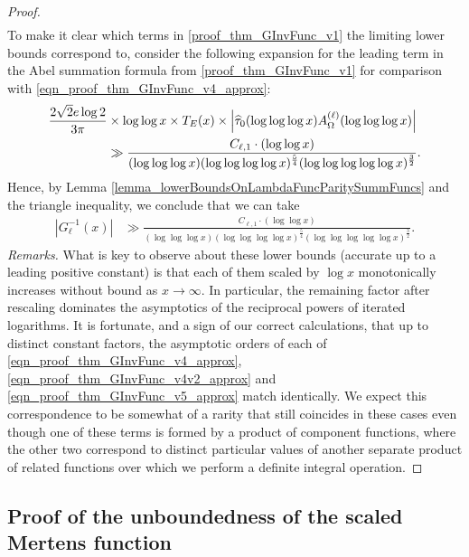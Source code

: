 \documentclass[11pt,reqno,a4letter]{article}
\numberwithin{figure}{section}
\numberwithin{table}{section}
\theoremstyle{plain}
\numberwithin{theorem}{section}
\theoremstyle{definition}
\newcommand{\SuccSim}[0]{\overset{_{\scriptsize{\blacktriangle}}}{\succsim}}
\renewcommand{\SuccSim}[0]{\ensuremath{\gg}}
\begin{document}
\begin{proof}
\begin{align}
\end{align} 
To make it clear which terms in \eqref{proof_thm_GInvFunc_v1} 
the limiting lower bounds correspond to, consider the following expansion for the leading term in 
the Abel summation formula from \eqref{proof_thm_GInvFunc_v1} for comparison with 
\eqref{eqn_proof_thm_GInvFunc_v4_approx}: 
\begin{align} 
\notag 
\frac{2\sqrt{2} e \log 2}{3\pi} & \times \log\log x \times T_E(x) \times 
     \left\lvert \widehat{\tau}_0(\log\log\log x) A_{\Omega}^{(\ell)}(\log\log\log x) \right\rvert \\ 
\label{eqn_proof_thm_GInvFunc_v5_approx} 
     & \gg \frac{C_{\ell,1} \cdot (\log\log x)}{ 
     (\log\log\log x) (\log\log\log\log x)^{\frac{5}{4}} 
     (\log\log\log\log\log x)^{\frac{3}{2}}}. 
\end{align} 
Hence, by 
Lemma \ref{lemma_lowerBoundsOnLambdaFuncParitySummFuncs} and the triangle inequality, 
we conclude that we can take 
\begin{align*} 
\left\lvert G_{\ell}^{-1}\left(x\right) \right\rvert
     & \SuccSim 
     \frac{C_{\ell,1} \cdot (\log\log x)}{ 
     (\log\log\log x) (\log\log\log\log x)^{\frac{5}{4}} 
     (\log\log\log\log\log x)^{\frac{3}{2}}}. 
\end{align*} 
\textit{Remarks. } 
What is key to observe about these lower bounds (accurate up to a leading positive constant) 
is that each of them scaled by $\log x$ 
monotonically increases without bound as $x \rightarrow \infty$. In particular, the remaining factor 
after rescaling dominates the asymptotics of the reciprocal powers of iterated logarithms. 
It is fortunate, and a sign of our correct calculations, that up to distinct constant factors, the 
asymptotic orders of each of 
\eqref{eqn_proof_thm_GInvFunc_v4_approx}, 
\eqref{eqn_proof_thm_GInvFunc_v4v2_approx} and 
\eqref{eqn_proof_thm_GInvFunc_v5_approx} 
match identically. We expect this correspondence to be somewhat of a rarity that still 
coincides in these cases even though one of these terms 
is formed by a product of component functions, where the other two correspond to 
distinct particular values of another separate product of related functions over 
which we perform a definite integral operation. 
\end{proof} 

\subsection{Proof of the unboundedness of the scaled Mertens function}
\label{subSection_TheCoreResultProof} 
\end{document}
